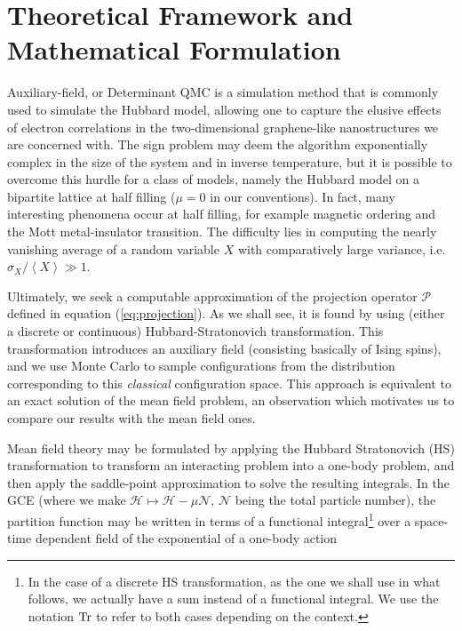 \section{Theoretical Framework and Mathematical Formulation}
\label{sec:matform}

Auxiliary-field, or Determinant \acs{QMC} is a simulation method that is commonly used to simulate the Hubbard model, allowing one to capture the elusive effects of electron correlations in the two-dimensional graphene-like nanostructures we are concerned with.
The sign problem may deem the algorithm exponentially complex in the size of the system and in inverse temperature, but it is possible to overcome this hurdle for a class of models, namely the Hubbard model on a bipartite lattice at half filling ($\mu = 0$ in our conventions).
In fact, many interesting phenomena occur at half filling, for example magnetic ordering and the Mott metal-insulator transition.
The difficulty lies in computing the nearly vanishing average of a random variable $X$ with comparatively large variance, i.e. $\sigma_X / \left\langle X \right\rangle \gg 1$.

Ultimately, we seek a computable approximation of the projection operator $\mathcal{P}$ defined in equation (\ref{eq:projection}).
As we shall see, it is found by using (either a discrete or continuous) Hubbard-Stratonovich transformation.
This transformation introduces an auxiliary field (consisting basically of Ising spins), and we use Monte Carlo to sample configurations from the distribution corresponding to this \emph{classical} configuration space.
This approach is equivalent to an exact solution of the mean field problem, an observation which motivates us to compare our results with the mean field ones.

Mean field theory may be formulated by applying the Hubbard Stratonovich (HS)  transformation to transform an interacting problem into a one-body problem, and then apply the saddle-point approximation to solve the resulting integrals.
In the \ac{GCE} (where we make $\mathcal{H} \mapsto \mathcal{H} - \mu \mathcal{N}$, $\mathcal{N}$ being the total particle number), the partition function may be written in terms of a functional integral\footnote{In the case of a discrete HS transformation, as the one we shall use in what follows, we actually have a sum instead of a functional integral.
We use the notation $\operatorname{Tr}$ to refer to both cases depending on the context.} over a space-time dependent field of the exponential of a one-body action

